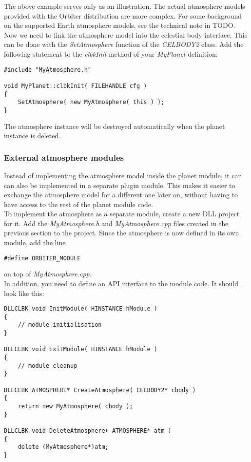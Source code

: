 \documentclass[Orbiter Developer Manual.tex]{subfiles}
\begin{document}
\noindent
The above example serves only as an illustration. The actual atmosphere models provided with the Orbiter distribution are more complex. For some background on the supported Earth atmosphere models, see the technical note in TODO.\\
Now we need to link the atmosphere model into the celestial body interface. This can be done with the \textit{SetAtmosphere} function of the \textit{CELBODY2} class. Add the following statement to the \textit{clbkInit} method of your \textit{MyPlanet} definition:

\begin{lstlisting}
#include "MyAtmosphere.h"

void MyPlanet::clbkInit( FILEHANDLE cfg )
{
	SetAtmosphere( new MyAtmosphere( this ) );
}
\end{lstlisting}

\noindent
The atmosphere instance will be destroyed automatically when the planet instance is deleted.


\subsubsection{External atmosphere modules}
Instead of implementing the atmosphere model inside the planet module, it can can also be implemented in a separate plugin module. This makes it easier to exchange the atmosphere model for a different one later on, without having to have access to the rest of the planet module code.\\
To implement the atmosphere as a separate module, create a new DLL project for it. Add the \textit{MyAtmosphere.h} and \textit{MyAtmosphere.cpp} files created in the previous section to the project. Since the atmosphere is now defined in its own module, add the line

\begin{lstlisting}
#define ORBITER_MODULE

\end{lstlisting}

\noindent
on top of \textit{MyAtmosphere.cpp}.\\
In addition, you need to define an API interface to the module code. It should look like this:

\begin{lstlisting}
DLLCLBK void InitModule( HINSTANCE hModule )
{
	// module initialisation
}

DLLCLBK void ExitModule( HINSTANCE hModule )
{
	// module cleanup
}

DLLCLBK ATMOSPHERE* CreateAtmosphere( CELBODY2* cbody )
{
	return new MyAtmosphere( cbody );
}

DLLCLBK void DeleteAtmosphere( ATMOSPHERE* atm )
{
	delete (MyAtmosphere*)atm;
}
\end{lstlisting}
\end{document}
